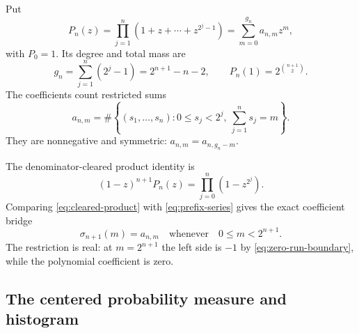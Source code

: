 \documentclass[11pt,oneside]{article}
\theoremstyle{definition}
\theoremstyle{remark}
\begin{document}
Put
\begin{equation}
 P_n(z)=\prod_{j=1}^{n}(1+z+\cdots+z^{2^j-1})
       =\sum_{m=0}^{g_n}a_{n,m}z^m,                        \label{eq:Pn}
\end{equation}
with $P_0=1$.  Its degree and total mass are
\begin{equation}
 g_n=\sum_{j=1}^{n}(2^j-1)=2^{n+1}-n-2,
 \qquad
 P_n(1)=2^{\binom{n+1}{2}}.                                \label{eq:degree-mass}
\end{equation}
The coefficients count restricted sums
\begin{equation}
 a_{n,m}=
 \#\left\{(s_1,\ldots,s_n):
 0\le s_j<2^j,\ \sum_{j=1}^{n}s_j=m\right\}.              \label{eq:coefficient-count}
\end{equation}
They are nonnegative and symmetric: $a_{n,m}=a_{n,g_n-m}$.

The denominator-cleared product identity is
\begin{equation}
 (1-z)^{n+1}P_n(z)=\prod_{j=0}^{n}(1-z^{2^j}).              \label{eq:cleared-product}
\end{equation}
Comparing \eqref{eq:cleared-product} with
\eqref{eq:prefix-series} gives the exact coefficient bridge
\begin{equation}
 \boxed{\displaystyle
 \sigma_{n+1}(m)=a_{n,m}
 \quad\text{whenever}\quad 0\le m<2^{n+1}.}               \label{eq:prefix-coefficient}
\end{equation}
The restriction is real: at $m=2^{n+1}$ the left side is $-1$ by
\eqref{eq:zero-run-boundary}, while the polynomial coefficient is zero.

\subsection{The centered probability measure and histogram}
\end{document}
